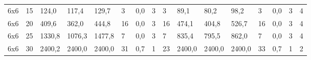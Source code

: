 \begin{table}[]
\begin{tabular}{llllllllllllllll}
		6x6     & 15     & 124,0                                               & 117,4                                               & 129,7                                               & 3                                                   & 0,0                                                 & 3      & 3                                                         & 89,1                                                & 80,2                                                & 98,2                                                & 3                                                   & 0,0                                                 & 3      & 4                                                         \\
		6x6     & 20     & 409,6                                               & 362,0                                               & 444,8                                               & 16                                                  & 0,0                                                 & 3      & 16                                                        & 474,1                                               & 404,8                                               & 526,7                                               & 16                                                  & 0,0                                                 & 3      & 4                                                         \\
		6x6     & 25     & 1330,8                                              & 1076,3                                              & 1477,8                                              & 7                                                   & 0,0                                                 & 3      & 7                                                         & 835,4                                               & 795,5                                               & 862,0                                               & 7                                                   & 0,0                                                 & 3      & 4                                                         \\
		6x6     & 30     & 2400,2                                              & 2400,0                                              & 2400,0                                              & 31                                                  & 0,7                                                 & 1      & 23                                                        & 2400,0                                              & 2400,0                                              & 2400,0                                              & 33                                                  & 0,7                                                 & 1      & 2                                                         \\

\end{tabular}
\end{table}
